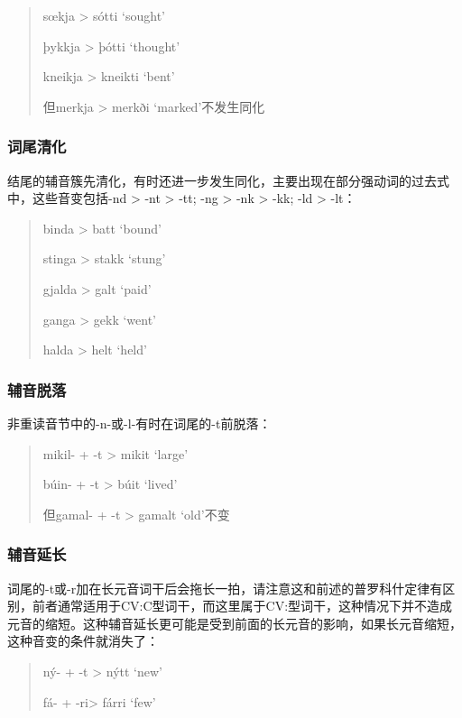 \begin{quote}
  sœkja > sótti `sought'

  þykkja > þótti `thought'

  kneikja > kneikti `bent'

  但merkja > merkði `marked'不发生同化
\end{quote}

\subsubsection{词尾清化}
\label{词尾清化}

结尾的辅音簇先清化，有时还进一步发生同化，主要出现在部分强动词的过去式中，这些音变包括-nd
> -nt > -tt; -ng > -nk
> -kk; -ld > -lt：

\begin{quote}
  binda > batt `bound'

  stinga > stakk `stung'

  gjalda > galt `paid'

  ganga > gekk `went'

  halda > helt `held'
\end{quote}

\subsubsection{辅音脱落}
\label{辅音脱落}

非重读音节中的-n-或-l-有时在词尾的-t前脱落：

\begin{quote}
  mikil- + -t > mikit `large'

  búin- + -t > búit `lived'

  但gamal- + -t > gamalt `old'不变
\end{quote}

\subsubsection{辅音延长}
\label{辅音延长}

词尾的-t或-r加在长元音词干后会拖长一拍，请注意这和前述的普罗科什定律有区别，前者通常适用于CV:C型词干，而这里属于CV:型词干，这种情况下并不造成元音的缩短。这种辅音延长更可能是受到前面的长元音的影响，如果长元音缩短，这种音变的条件就消失了：

\begin{quote}
  ný- + -t > nýtt `new'

  fá- + -ri> fárri `few'
\end{quote}

